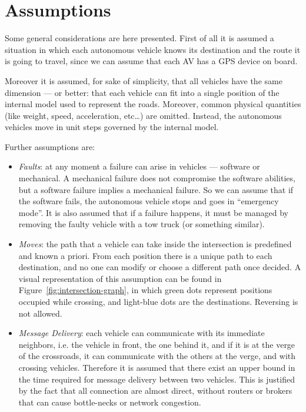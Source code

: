 \documentclass{memoir}
\begin{document}
\section{Assumptions}

Some general considerations are here presented. First of all it is assumed a situation in which each autonomous vehicle knows its destination and the route it is going to travel, since we can assume that each AV has a GPS device on board.

Moreover it is assumed, for sake of simplicity, that all vehicles have the same dimension --- or better: that each vehicle can fit into a single position of the internal model used to represent the roads. Moreover, common physical quantities (like weight, speed, acceleration, etc\dots) are omitted. Instead, the autonomous vehicles move in unit steps governed by the internal model.
\newline

Further assumptions are:

\begin{itemize}
	\item \emph{Faults}: at any moment a failure can arise in vehicles --- software or mechanical. A mechanical failure does not compromise the software abilities, but a software failure implies a mechanical failure. So we can assume that if the software fails, the autonomous vehicle stops and goes in ``emergency mode''. It is also assumed that if a failure happens, it must be managed by removing the faulty vehicle with a tow truck (or something similar).
	\item \emph{Moves}: the path that a vehicle can take inside the intersection is predefined and known a priori. From each position there is a unique path to each destination, and no one can modify or choose a different path once decided. A visual representation of this assumption can be found in Figure~\ref{fig:intersection-graph}, in which green dots represent positions occupied while crossing, and light-blue dots are the destinations. Reversing is not allowed.
	\item \emph{Message Delivery}: each vehicle can communicate with its immediate neighbors, i.e. the vehicle in front, the one behind it, and if it is at the verge of the crossroads, it can communicate with the others at the verge, and with crossing vehicles. Therefore it is assumed that there exist an upper bound in the time required for message delivery between two vehicles. This is justified by the fact that all connection are almost direct, without routers or brokers that can cause bottle-necks or network congestion.
\end{itemize}
\end{document}
